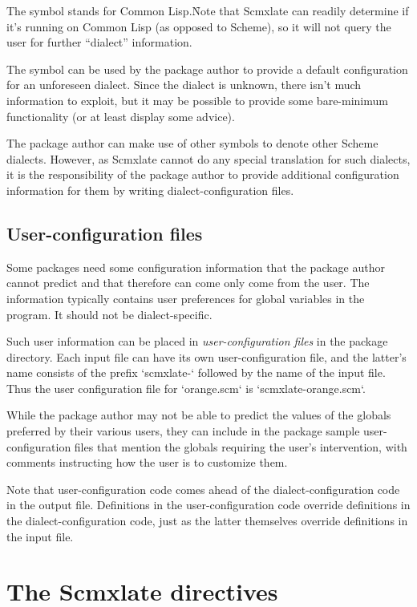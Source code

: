 The symbol  stands  for
Common Lisp.\f{Note that
Scmxlate can readily determine if it’s running
on Common Lisp (as opposed to Scheme), so it will not query the user
for further “dialect” information.}

The symbol  can be used by the package author
to provide a default configuration for an unforeseen
dialect.  Since the dialect is unknown, there isn’t
much information to exploit, but it may be
possible to provide some bare-minimum functionality
(or at least display some advice).

The package author can make use of other symbols to
denote other Scheme dialects.  However, as Scmxlate
cannot do any special translation for such dialects, it
is the responsibility of the package author to provide
additional configuration information for them by
writing dialect-configuration files.

\subsection{User-configuration files}

Some packages need some configuration information that
the package author cannot predict and that therefore
can come only come from the user.  The information
typically contains user preferences for global
variables in the program.  It should not be
dialect-specific.

Such user information can be placed in {\em
user-configuration files} in the package directory.
Each input file can have its own
user-configuration file, and the latter’s name
consists of the prefix `scmxlate-` followed by the
name of the input file.  Thus the user configuration
file for `orange.scm` is `scmxlate-orange.scm`.

While the package author may not be able to predict the
values of the globals preferred by their various
users, they can include in the package sample
user-configuration files that mention the globals
requiring the user’s intervention, with comments
instructing how the user is to customize them.

Note that user-configuration code comes ahead of the
dialect-configuration code in the output file.
Definitions in the user-configuration code override
definitions in the dialect-configuration code, just
as the latter themselves override definitions in the
input file.

\section{The Scmxlate directives}
\label{glossary}

